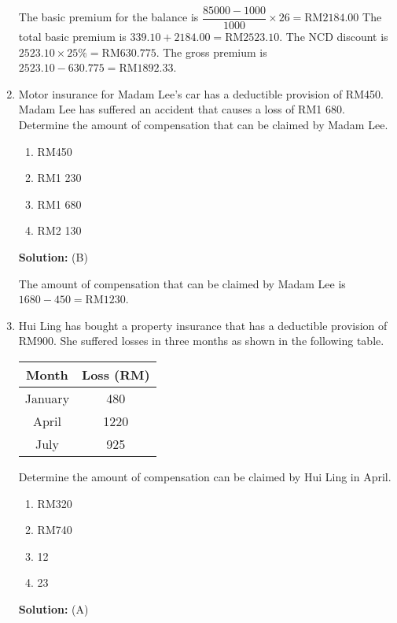 \documentclass{report}
\newcommand{\sol}{

    \vspace{0.5em}\textbf{Solution:}\vspace{0.5em}}
\begin{document}
\begin{enumerate}
          The basic premium for the balance is $\dfrac{85 000 - 1000}{1000} \times 26 =
              \text{RM} 2 184.00$ The total basic premium is $339.10 + 2 184.00 = \text{RM} 2
              523.10$. The NCD discount is $2 523.10 \times 25 \% = \text{RM} 630.775$. The
          gross premium is $2 523.10 - 630.775 = \text{RM} 1 892.33$. \newpage

    \item Motor insurance for Madam Lee's car has a deductible provision of RM450. Madam
          Lee has suffered an accident that causes a loss of RM1 680. Determine the
          amount of compensation that can be claimed by Madam Lee.
          \begin{enumerate}[label=(\Alph*)]
              \item RM450
              \item RM1 230
              \item RM1 680
              \item RM2 130
          \end{enumerate}
          \sol{} (B)

          The amount of compensation that can be claimed by Madam Lee is $1 680 - 450 =
              \text{RM} 1 230$. \vspace{0.5cm}
    \item Hui Ling has bought a property insurance that has a deductible provision of
          RM900. She suffered losses in three months as shown in the following table.

          \begin{tabular}{|c|c|}
              \hline Month   & Loss (RM) \\
              \hline January & 480       \\
              \hline April   & 1220      \\
              \hline July    & 925       \\
              \hline
          \end{tabular}

          Determine the amount of compensation can be claimed by Hui Ling in April.
          \begin{enumerate}[label=(\Alph*)]
              \item RM320
              \item RM740
              \item 12
              \item 23
          \end{enumerate}
          \sol{} (A)


\end{enumerate}
\end{document}
